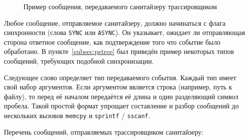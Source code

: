 \begin{figure}[H]

    \caption{Пример сообщения, передаваемого санитайзеру трассировщиком}
\end{figure}

Любое сообщение, отправляемое санитайзеру, должно начинаться с флага синхронности (слова \texttt{SYNC} или \texttt{ASYNC}). Он указывает, ожидает ли отправляющая сторона ответное сообщение, как подтверждение того что событие было обработано. В пункте~\ref{subsec:pstree} был приведён пример некоторых типов сообщений, требующих подобной синхронизации.

Следующее слово определяет тип передаваемого события. Каждый тип имеет свой набор аргументов. Если аргументом является строка (например, путь к файлу), то перед её началом передаётся её длина и один разделяющий символ пробела. Такой простой формат упрощает составление и разбор сообщений до нескольких вызовов \texttt{memcpy} и \texttt{sprintf} / \texttt{sscanf}.

Перечень сообщений, отправляемых трассировщиком санитайзеру:

